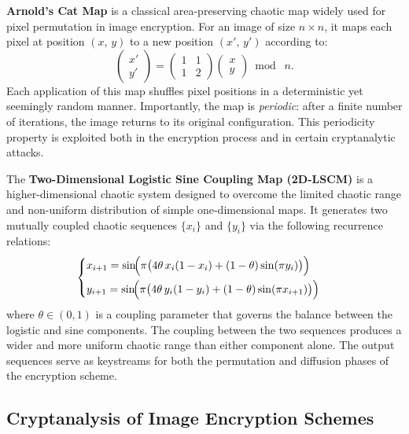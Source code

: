 \textbf{Arnold's Cat Map} is a classical area-preserving chaotic map widely used for pixel permutation in image encryption. For an image of size $n \times n$, it maps each pixel at position $(x,\, y)$ to a new position $(x',\, y')$ according to:
\begin{equation}
\begin{pmatrix} x' \\ y' \end{pmatrix}
=
\begin{pmatrix} 1 & 1 \\ 1 & 2 \end{pmatrix}
\begin{pmatrix} x \\ y \end{pmatrix}
\bmod\; n.
\end{equation}
Each application of this map shuffles pixel positions in a deterministic yet seemingly random manner. Importantly, the map is \textit{periodic}: after a finite number of iterations, the image returns to its original configuration. This periodicity property is exploited both in the encryption process and in certain cryptanalytic attacks.


The \textbf{Two-Dimensional Logistic Sine Coupling Map (2D-LSCM)} is a higher-dimensional chaotic system designed to overcome the limited chaotic range and non-uniform distribution of simple one-dimensional maps. It generates two mutually coupled chaotic sequences $\{x_i\}$ and $\{y_i\}$ via the following recurrence relations:
\begin{equation}
\begin{cases}
x_{i+1} = \sin\!\Bigl(\pi\bigl(4\theta\, x_i(1 - x_i) + (1 - \theta)\sin(\pi y_i)\bigr)\Bigr) \\[6pt]
y_{i+1} = \sin\!\Bigl(\pi\bigl(4\theta\, y_i(1 - y_i) + (1 - \theta)\sin(\pi x_{i+1})\bigr)\Bigr)
\end{cases}
\end{equation}
where $\theta \in (0, 1)$ is a coupling parameter that governs the balance between the logistic and sine components. The coupling between the two sequences produces a wider and more uniform chaotic range than either component alone. The output sequences serve as keystreams for both the permutation and diffusion phases of the encryption scheme.


\subsection{Cryptanalysis of Image Encryption Schemes}

